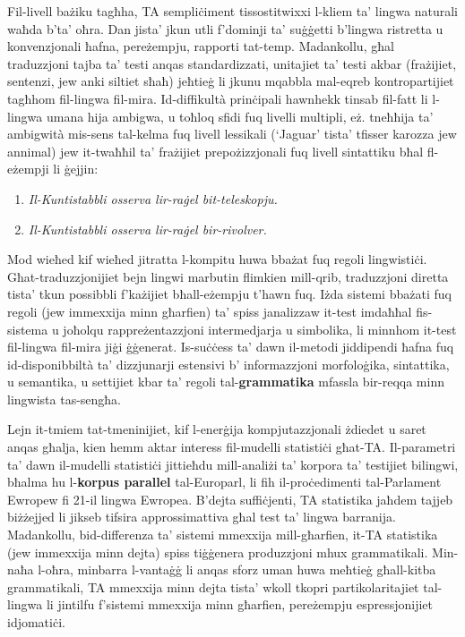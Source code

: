 \documentclass[]{../../metanetpaper}
\begin{document}
\begin{multicols}{2}
Fil-livell bażiku tagħha, TA sempliċiment tissostitwixxi l-kliem ta' lingwa naturali waħda b'ta' oħra. Dan jista’ jkun utli f'dominji ta' suġġetti b’lingwa ristretta u konvenzjonali ħafna, pereżempju, rapporti tat-temp. Madankollu, għal traduzzjoni tajba ta’ testi anqas standardizzati, unitajiet ta’ testi akbar (frażijiet, sentenzi, jew anki siltiet sħaħ) jeħtieġ li jkunu mqabbla mal-eqreb kontropartijiet tagħhom fil-lingwa fil-mira. Id-diffikultà prinċipali hawnhekk tinsab fil-fatt li l-lingwa umana hija ambigwa, u toħloq  sfidi fuq livelli multipli, eż. tneħħija ta’ ambigwità mis-sens tal-kelma fuq livell lessikali (`Jaguar' tista’ tfisser karozza jew annimal) jew it-twaħħil ta’ frażijiet prepożizzjonali fuq livell sintattiku bħal fl-eżempji li ġejjin:

\begin{enumerate}%
\item \emph{Il-Kuntistabbli osserva lir-raġel bit-teleskopju.}
\item \emph{Il-Kuntistabbli osserva lir-raġel bir-rivolver.}
\end{enumerate}

Mod wieħed kif wieħed jitratta l-kompitu huwa bbażat fuq regoli lingwistiċi. Għat-traduzzjonijiet bejn lingwi marbutin flimkien mill-qrib, traduzzjoni diretta tista’ tkun possibbli f'każijiet bħall-eżempju t’hawn fuq. Iżda sistemi bbażati fuq regoli (jew immexxija minn għarfien) ta’ spiss janalizzaw it-test imdaħħal fis-sistema u joħolqu rappreżentazzjoni intermedjarja u simbolika, li minnhom it-test fil-lingwa fil-mira jiġi ġġenerat. Is-suċċess ta’ dawn il-metodi jiddipendi ħafna fuq id-disponibbiltà ta’ dizzjunarji estensivi b’ informazzjoni morfoloġika, sintattika, u semantika, u settijiet kbar ta’ regoli tal-\textbf{grammatika} mfassla bir-reqqa minn lingwista tas-sengħa.

Lejn it-tmiem tat-tmeninijiet, kif l-enerġija kompjutazzjonali żdiedet u saret anqas għalja, kien hemm aktar interess fil-mudelli statistiċi għat-TA. Il-parametri ta’ dawn il-mudelli statistiċi jittieħdu mill-analiżi ta’ korpora ta’ testijiet bilingwi, bħalma hu l-\textbf{korpus parallel} tal-Europarl, li fih il-proċedimenti tal-Parlament Ewropew fi 21-il lingwa Ewropea. B’dejta suffiċjenti, TA statistika jaħdem tajjeb biżżejjed li jikseb tifsira approssimattiva għal test ta’ lingwa barranija. Madankollu, bid-differenza ta’ sistemi mmexxija mill-għarfien, it-TA statistika (jew immexxija minn dejta) spiss tiġġenera produzzjoni mhux grammatikali. Min-naħa l-oħra, minbarra l-vantaġġ li anqas sforz uman huwa meħtieġ għall-kitba grammatikali, TA mmexxija minn dejta tista’ wkoll tkopri partikolaritajiet tal-lingwa li jintilfu f’sistemi mmexxija minn għarfien, pereżempju espressjonijiet idjomatiċi.


\end{multicols}
\end{document}
